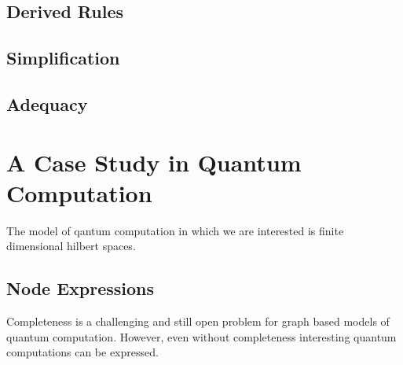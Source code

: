 \documentclass[runningheads]{llncs}
\begin{document}
\subsection{Derived Rules}


\subsection{Simplification}


\subsection{Adequacy}











\section{A Case Study in Quantum Computation}

The model of qantum computation in which we are interested is finite
dimensional hilbert spaces. 

\subsection{Node Expressions}
\label{ssec:node-expressions}


Completeness is a challenging and still open problem for graph based
models of quantum computation. However, even without completeness
interesting quantum computations can be expressed.
\end{document}
